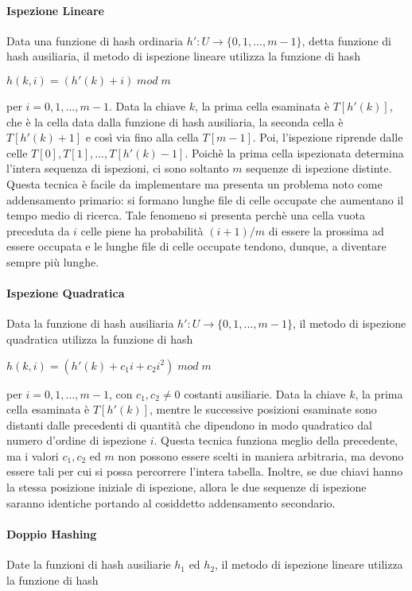 \paragraph{Ispezione Lineare}
Data una funzione di hash ordinaria \(h':U\to \{0,1,...,m-1\}\), detta funzione di hash ausiliaria, il metodo di ispezione lineare utilizza la funzione di hash

\(h(k,i)=(h'(k)+i)\;mod\;m\)

\noindent per \(i=0,1,...,m-1\). Data la chiave \(k\), la prima cella esaminata è \(T[h'(k)]\), che è la cella data dalla funzione di hash ausiliaria, la seconda cella è \(T[h'(k)+1]\) e così via fino alla cella \(T[m-1]\). Poi, l'ispezione riprende dalle celle \(T[0], T[1],...,T[h'(k)-1]\). Poichè la prima cella ispezionata determina l'intera sequenza di ispezioni, ci sono soltanto \(m\) sequenze di ispezione distinte. Questa tecnica è facile da implementare ma presenta un problema noto come addensamento primario: si formano lunghe file di celle occupate che aumentano il tempo medio di ricerca. Tale fenomeno si presenta perchè una cella vuota preceduta da \(i\) celle piene ha probabilità \((i+1)/m\) di essere la prossima ad essere occupata e le lunghe file di celle occupate tendono, dunque, a diventare sempre più lunghe.

\paragraph{Ispezione Quadratica} Data la funzione di hash ausiliaria \(h':U\to \{0,1,...,m-1\}\), il metodo di ispezione quadratica utilizza la funzione di hash

\(h(k,i)=(h'(k)+c_1i+c_2i^2)\;mod\;m\)

\noindent per \(i=0,1,...,m-1\), con \(c_1, c_2 \neq 0 \) costanti ausiliarie. Data la chiave \(k\), la prima cella esaminata è \(T[h'(k)]\), mentre le successive posizioni esaminate sono distanti dalle precedenti di quantità che dipendono in modo quadratico dal numero d'ordine di ispezione \(i\). Questa tecnica funziona meglio della precedente, ma i valori \(c_1, c_2\) ed \(m\) non possono essere scelti in maniera arbitraria, ma devono essere tali per cui si possa percorrere l'intera tabella. Inoltre, se due chiavi hanno la stessa posizione iniziale di ispezione, allora le due sequenze di ispezione saranno identiche portando al cosiddetto addensamento secondario.

\paragraph{Doppio Hashing} Date la funzioni di hash ausiliarie \(h_1\) ed \(h_2\), il metodo di ispezione lineare utilizza la funzione di hash

